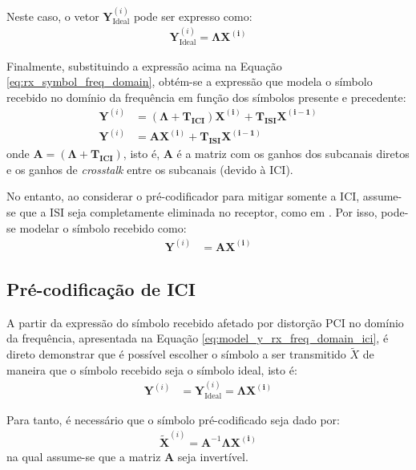 Neste caso, o vetor $\mathbf{Y}_\text{Ideal}^{(i)}$ pode ser expresso como:
\begin{align}
\mathbf{Y}_\text{Ideal}^{(i)} = \mathbf{\Lambda \mathbf{X^{(i)}}}
\end{align}

Finalmente, substituindo a expressão acima na Equação \ref{eq:rx_symbol_freq_domain}, obtém-se a expressão que modela o símbolo recebido no domínio da frequência em função dos símbolos presente e precedente:
\begin{align}
\mathbf{Y}^{(i)} &=\left(\mathbf{\Lambda} + \mathbf{ T_\text{ICI}}\right) \mathbf{X^{(i)}} + \mathbf{ T_\text{ISI}} \mathbf{X^{(i-1)}}\nonumber\\
\mathbf{Y}^{(i)} &= \mathbf{A} \mathbf{X^{(i)}} + \mathbf{ T_\text{ISI}} \mathbf{X^{(i-1)}}
\label{eq:model_y_rx_freq_domain}
\end{align}
onde $\mathbf{A}=\left(\mathbf{\Lambda} + \mathbf{ T_\text{ICI}}\right)$, isto é, $\mathbf{A}$ é a matriz com os ganhos dos subcanais diretos e os ganhos de \textsl{crosstalk} entre os subcanais (devido à ICI).

No entanto, ao considerar o pré-codificador para mitigar somente a ICI, assume-se que a ISI seja completamente eliminada no receptor, como em  \cite{Malkin08,Park04}. Por isso, pode-se modelar o símbolo recebido como:
\begin{align}
\mathbf{Y}^{(i)} &= \mathbf{A} \mathbf{X^{(i)}}
\label{eq:model_y_rx_freq_domain_ici}
\end{align}

\subsection{Pré-codificação de ICI}

A partir da expressão do símbolo recebido afetado por distorção PCI no domínio da frequência, apresentada na Equação \ref{eq:model_y_rx_freq_domain_ici}, é direto demonstrar que é possível escolher o símbolo a ser transmitido $\tilde{X}$ de maneira que o símbolo recebido seja o símbolo ideal, isto é:
\begin{align}
\mathbf{Y}^{(i)} &= \mathbf{Y}_\text{Ideal}^{(i)} = \mathbf{\Lambda} \mathbf{X^{(i)}} \nonumber
\end{align}

Para tanto, é necessário que o símbolo pré-codificado seja dado por:
\begin{align}
\mathbf{\tilde{X}}^{(i)} = \mathbf{A}^{-1}\mathbf{\Lambda} \mathbf{X^{(i)}}
\label{eq:precoder_ici_isi}
\end{align}
na qual assume-se que a matriz $\mathbf{A}$ seja invertível.

